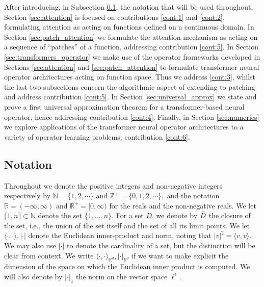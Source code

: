 \documentclass[twoside]{article}
\newcommand{\1}{\mathbbm{1}}
\newcommand{\R}{\mathbbm{R}}
\newcommand{\Z}{\mathbbm{Z}}
\newcommand{\N}{\mathbbm{N}}
\newcommand{\range}[2]{\llbracket #1, #2 \rrbracket}
\providecommand{\mathbbm}{\mathbb} %
\begin{document}
After introducing, in Subsection \ref{subsec:Notation}, the notation that will be used throughout,  Section \ref{sec:attention} is focused on contributions \ref{cont:1} and \ref{cont:2}, formulating attention as acting on functions defined on a continuous domain.  In Section \ref{sec:patch_attention} we formulate the attention mechanism as acting on a sequence of ``patches'' of a function, addressing
contribution \ref{cont:5}.
In Section \ref{sec:transformers_operator} we make use of the operator frameworks developed in Sections \ref{sec:attention} and \ref{sec:patch_attention} to formulate transformer neural operator architectures acting on function space. Thus we address  \ref{cont:3}, whilst the last two subsections concern the algorithmic aspect of extending to patching and address contribution \ref{cont:5}.
In Section \ref{sec:universal_approx} we state and prove a first universal approximation theorem for a transformer-based neural operator, hence addressing contribution \ref{cont:4}. 
Finally, in Section \ref{sec:numerics} we explore applications of the transformer neural operator architectures to a variety of operator learning problems, contribution \ref{cont:6}.




\subsection{Notation}

\label{subsec:Notation}

Throughout we denote the positive integers and non-negative integers
respectively by $\N=\{1,2,\cdots\}$ and $\Z^+=\{0,1,2,\cdots\},$
and the notation $\R=(-\infty,\infty)$ and $\R^+=[0,\infty)$ for the
reals and the non-negative reals. We let $\range{1}{n} \subset\N$ denote the set $\{1,\ldots,n\}$. For a set $D$, we denote by $\Bar{D}$ the closure of the set, i.e., the union of the set itself and the set of all its limit points. We let
$\langle \cdot, \cdot \rangle, |\cdot|$ denote the
Euclidean inner-product and norm, noting that
$|v|^2=\langle v,v \rangle.$ We may also use $|\cdot|$ to denote the cardinality of a set, but the distinction will be clear from context. We write $\langle \cdot, \cdot \rangle_{\R^d}, |\cdot|_{\R^d}$ if we want to make explicit the dimension of the space on which the Euclidean inner product is computed. We will also denote by $|\cdot|_1$ the norm on the vector space $\ell^1$.
\end{document}
